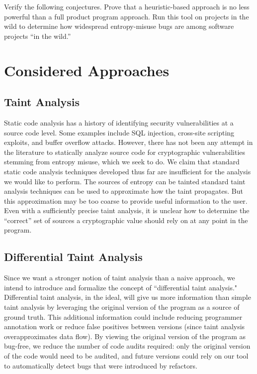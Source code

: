 \documentclass[letterpaper,twocolumn,10pt]{article}
\begin{document}
Verify the following conjectures. Prove that a heuristic-based approach is no less powerful than a full product program approach.
Run this tool on projects in the wild to determine how widespread entropy-misuse bugs are among software projects ``in the wild.''

\section{Considered Approaches}

\subsection{Taint Analysis}
Static code analysis has a history of identifying security vulnerabilities at a source code level. Some examples include SQL injection, cross-site scripting exploits, and buffer overflow attacks. However, there has not been any attempt in the literature to statically analyze source code for cryptographic vulnerabilities stemming from entropy misuse, which we seek to do. We claim that standard static code analysis techniques developed thus far are insufficient for the analysis we would like to perform. 
The sources of entropy can be tainted standard taint analysis techniques can be used to approximate how the taint propagates. But this approximation may be too coarse to provide useful information to the user. Even with a sufficiently precise taint analysis, it is unclear how to determine the ``correct'' set of sources a cryptographic value should rely on at any point in the program.

\subsection{Differential Taint Analysis}

Since we want a stronger notion of taint analysis than a naive approach, we intend to introduce and formalize the concept of ``differential taint analysis." Differential
taint analysis, in the ideal, will give us more information than simple taint analysis by leveraging 
the original version of the program as a source of ground truth. This additional information could include reducing programmer annotation work or reduce false positives between versions
(since taint analysis overapproximates data flow). By viewing the original version of the program as bug-free, we reduce the number of code audits required:
only the original version of the code would need to be audited, and future versions could rely on our tool to automatically detect bugs that were introduced by refactors.
\end{document}
